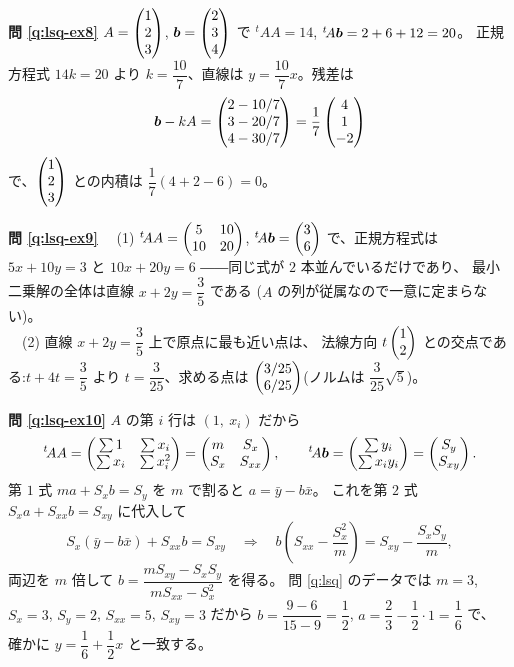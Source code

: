 \bigskip
\noindent\textbf{問 \ref{q:lsq-ex8}}\quad
$A = \begin{pmatrix}1 \\ 2 \\ 3\end{pmatrix}$, $\bm{b} = \begin{pmatrix}2 \\ 3 \\ 4\end{pmatrix}$ で
${}^t\!AA = 14$, ${}^t\!A\bm{b} = 2 + 6 + 12 = 20$。
正規方程式 $14k = 20$ より $k = \dfrac{10}{7}$、直線は
$y = \dfrac{10}{7}x$。残差は
\[
\bm{b} - kA = \begin{pmatrix}2 - 10/7 \\ 3 - 20/7 \\ 4 - 30/7\end{pmatrix}
= \frac{1}{7}\begin{pmatrix}4 \\ 1 \\ -2\end{pmatrix}
\]
で、$\begin{pmatrix}1 \\ 2 \\ 3\end{pmatrix}$ との内積は $\dfrac{1}{7}(4 + 2 - 6) = 0$。

\bigskip
\noindent\textbf{問 \ref{q:lsq-ex9}}\quad
　(1) ${}^t\!AA = \begin{pmatrix}5 & 10 \\ 10 & 20\end{pmatrix}$,
${}^t\!A\bm{b} = \begin{pmatrix}3 \\ 6\end{pmatrix}$ で、正規方程式は
$5x + 10y = 3$ と $10x + 20y = 6$ ――同じ式が $2$ 本並んでいるだけであり、
最小二乗解の全体は直線 $x + 2y = \dfrac{3}{5}$ である
($A$ の列が従属なので一意に定まらない)。\\
　(2) 直線 $x + 2y = \dfrac{3}{5}$ 上で原点に最も近い点は、
法線方向 $t\begin{pmatrix}1 \\ 2\end{pmatrix}$ との交点である:$t + 4t = \dfrac{3}{5}$ より
$t = \dfrac{3}{25}$、求める点は
$\begin{pmatrix}3/25 \\ 6/25\end{pmatrix}$(ノルムは $\dfrac{3}{25}\sqrt{5}$)。

\bigskip
\noindent\textbf{問 \ref{q:lsq-ex10}}\quad
$A$ の第 $i$ 行は $(1,\ x_i)$ だから
\[
{}^t\!AA = \begin{pmatrix}\sum 1 & \sum x_i \\ \sum x_i & \sum x_i^2\end{pmatrix}
= \begin{pmatrix}m & S_x \\ S_x & S_{xx}\end{pmatrix}, \qquad
{}^t\!A\bm{b} = \begin{pmatrix}\sum y_i \\ \sum x_i y_i\end{pmatrix} = \begin{pmatrix}S_y \\ S_{xy}\end{pmatrix}.
\]
第 $1$ 式 $ma + S_x b = S_y$ を $m$ で割ると $a = \bar{y} - b\bar{x}$。
これを第 $2$ 式 $S_x a + S_{xx} b = S_{xy}$ に代入して
\[
S_x(\bar{y} - b\bar{x}) + S_{xx}b = S_{xy}
\quad\Longrightarrow\quad
b\left(S_{xx} - \frac{S_x^2}{m}\right) = S_{xy} - \frac{S_x S_y}{m},
\]
両辺を $m$ 倍して $b = \dfrac{m S_{xy} - S_x S_y}{m S_{xx} - S_x^2}$ を得る。
問 \ref{q:lsq} のデータでは $m = 3$, $S_x = 3$, $S_y = 2$,
$S_{xx} = 5$, $S_{xy} = 3$ だから
$b = \dfrac{9 - 6}{15 - 9} = \dfrac{1}{2}$,
$a = \dfrac{2}{3} - \dfrac{1}{2} \cdot 1 = \dfrac{1}{6}$ で、
確かに $y = \dfrac{1}{6} + \dfrac{1}{2}x$ と一致する。

